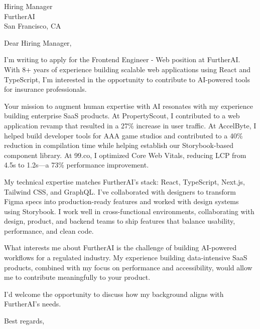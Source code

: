 \documentclass[11pt]{letter}
\begin{document}
\begin{letter}{%
Hiring Manager \\
FurtherAI \\
San Francisco, CA
}

\opening{Dear Hiring Manager,}

I'm writing to apply for the Frontend Engineer - Web position at FurtherAI. With 8+ years of experience building scalable web applications using React and TypeScript, I'm interested in the opportunity to contribute to AI-powered tools for insurance professionals.

Your mission to augment human expertise with AI resonates with my experience building enterprise SaaS products. At PropertyScout, I contributed to a web application revamp that resulted in a 27\% increase in user traffic. At AccelByte, I helped build developer tools for AAA game studios and contributed to a 40\% reduction in compilation time while helping establish our Storybook-based component library. At 99.co, I optimized Core Web Vitals, reducing LCP from 4.5s to 1.2s---a 73\% performance improvement.

My technical expertise matches FurtherAI's stack: React, TypeScript, Next.js, Tailwind CSS, and GraphQL. I've collaborated with designers to transform Figma specs into production-ready features and worked with design systems using Storybook. I work well in cross-functional environments, collaborating with design, product, and backend teams to ship features that balance usability, performance, and clean code.

What interests me about FurtherAI is the challenge of building AI-powered workflows for a regulated industry. My experience building data-intensive SaaS products, combined with my focus on performance and accessibility, would allow me to contribute meaningfully to your product.

I'd welcome the opportunity to discuss how my background aligns with FurtherAI's needs.

\closing{Best regards,}

\end{letter}
\end{document}
